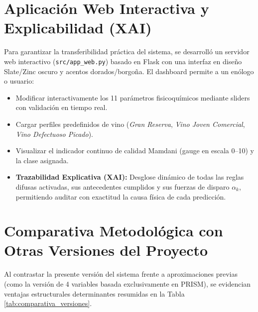 \documentclass[11pt,a4paper]{article}
\begin{document}
\section{Aplicación Web Interactiva y Explicabilidad (XAI)}

Para garantizar la transferibilidad práctica del sistema, se desarrolló un servidor web interactivo (\texttt{src/app\_web.py}) basado en Flask con una interfaz en diseño Slate/Zinc oscuro y acentos dorados/borgoña. El dashboard permite a un enólogo o usuario:
\begin{itemize}[noitemsep]
    \item Modificar interactivamente los 11 parámetros fisicoquímicos mediante sliders con validación en tiempo real.
    \item Cargar perfiles predefinidos de vino (\textit{Gran Reserva}, \textit{Vino Joven Comercial}, \textit{Vino Defectuoso Picado}).
    \item Visualizar el indicador continuo de calidad Mamdani (gauge en escala 0--10) y la clase asignada.
    \item \textbf{Trazabilidad Explicativa (XAI):} Desglose dinámico de todas las reglas difusas activadas, sus antecedentes cumplidos y sus fuerzas de disparo $\alpha_k$, permitiendo auditar con exactitud la causa física de cada predicción.
\end{itemize}

\section{Comparativa Metodológica con Otras Versiones del Proyecto}

Al contrastar la presente versión del sistema frente a aproximaciones previas (como la versión de 4 variables basada exclusivamente en PRISM), se evidencian ventajas estructurales determinantes resumidas en la Tabla \ref{tab:comparativa_versiones}.
\end{document}
